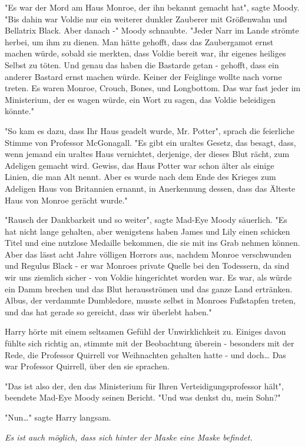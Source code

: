 {"Es war der Mord am Haus Monroe, der ihn bekannt gemacht hat", sagte Moody. "Bis dahin war Voldie nur ein weiterer dunkler Zauberer mit Größenwahn und Bellatrix Black. Aber danach -" Moody schnaubte. "Jeder Narr im Lande strömte herbei, um ihm zu dienen. Man hätte gehofft, dass das Zaubergamot ernst machen würde, sobald sie merkten, dass Voldie bereit war, ihr eigenes heiliges Selbst zu töten. Und genau das haben die Bastarde getan - gehofft, dass ein anderer Bastard ernst machen würde. Keiner der Feiglinge wollte nach vorne treten. Es waren Monroe, Crouch, Bones, und Longbottom. Das war fast jeder im Ministerium, der es wagen würde, ein Wort zu sagen, das Voldie beleidigen könnte."

"So kam es dazu, dass Ihr Haus geadelt wurde, Mr. Potter", sprach die feierliche Stimme von Professor McGonagall. "Es gibt ein uraltes Gesetz, das besagt, dass, wenn jemand ein uraltes Haus vernichtet, derjenige, der dieses Blut rächt, zum Adeligen gemacht wird. Gewiss, das Haus Potter war schon älter als einige Linien, die man Alt nennt. Aber es wurde nach dem Ende des Krieges zum Adeligen Haus von Britannien ernannt, in Anerkennung dessen, dass das Älteste Haus von Monroe gerächt wurde."

"Rausch der Dankbarkeit und so weiter", sagte Mad-Eye Moody säuerlich. "Es hat nicht lange gehalten, aber wenigstens haben James und Lily einen schicken Titel und eine nutzlose Medaille bekommen, die sie mit ins Grab nehmen können. Aber das lässt acht Jahre völligen Horrors aus, nachdem Monroe verschwunden und Regulus Black - er war Monroes private Quelle bei den Todessern, da sind wir uns ziemlich sicher - von Voldie hingerichtet worden war. Es war, als würde ein Damm brechen und das Blut herausströmen und das ganze Land ertränken. Albus, der verdammte Dumbledore, musste selbst in Monroes Fußstapfen treten, und das hat gerade so gereicht, dass wir überlebt haben."

Harry hörte mit einem seltsamen Gefühl der Unwirklichkeit zu. Einiges davon fühlte sich richtig an, stimmte mit der Beobachtung überein - besonders mit der Rede, die Professor Quirrell vor Weihnachten gehalten hatte - und doch… Das war Professor Quirrell, über den sie sprachen.

"Das ist also der, den das Ministerium für Ihren Verteidigungsprofessor hält", beendete Mad-Eye Moody seinen Bericht. "Und was denkst du, mein Sohn?"

"Nun…" sagte Harry langsam.

\emph{Es ist auch möglich, dass sich hinter der Maske eine Maske befindet.}

}
